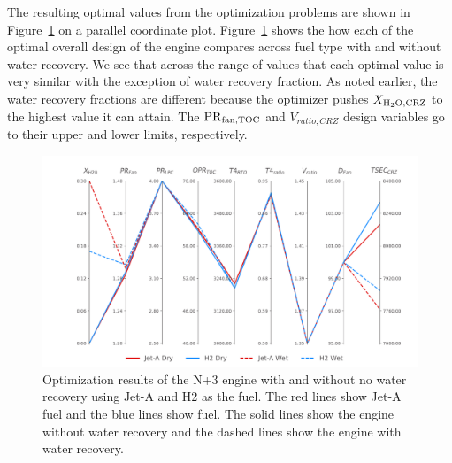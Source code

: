 \documentclass[conf]{new-aiaa}
\begin{document}
The resulting optimal values from the optimization problems are shown in Figure~\ref{fig:parallel_coords} on a parallel coordinate plot.
Figure~\ref{fig:parallel_coords} shows the how each of the optimal overall design of the engine compares across fuel type with and without water recovery.
We see that across the range of values that each optimal value is very similar with the exception of water recovery fraction.
As noted earlier, the water recovery fractions are different because the optimizer pushes $X_{\rm{{H_2O},CRZ}}$ to the highest value it can attain.
The $\rm{PR}_{fan,TOC}$ and $V_{ratio,CRZ}$ design variables go to their upper and lower limits, respectively.

\begin{figure}[hbt!]
  \centering
  \includegraphics[width=1.0\textwidth]{N3_parallel_coords.pdf}
  \caption{Optimization results of the N+3 engine with and without no water recovery using Jet-A and H2 as the fuel.
    The red lines show Jet-A fuel and the blue lines show  fuel.
    The solid lines show the engine without water recovery and the dashed lines show the engine with water recovery.}
  \label{fig:parallel_coords}
\end{figure}
\end{document}

